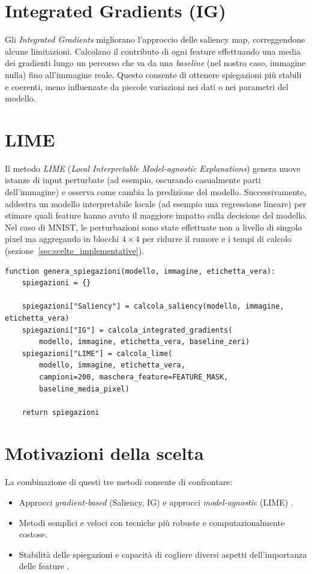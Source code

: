 \documentclass[12pt,a4paper,oneside]{report}
\numberwithin{figure}{chapter}
\numberwithin{table}{chapter}
\begin{document}
\section{Integrated Gradients (IG)}
Gli \emph{Integrated Gradients} \cite{sundararajan2017axiomatic} migliorano
l’approccio delle saliency map, correggendone alcune limitazioni. Calcolano il
contributo di ogni feature effettuando una media dei gradienti lungo un
percorso che va da una \emph{baseline} (nel nostro caso, immagine nulla) fino
all’immagine reale. Questo consente di ottenere spiegazioni più stabili e
coerenti, meno influenzate da piccole variazioni nei dati o nei parametri del
modello.

\section{LIME}
Il metodo \emph{LIME} (\emph{Local Interpretable Model-agnostic Explanations})
\cite{ribeiro2016lime} genera nuove istanze di input perturbate (ad esempio,
oscurando casualmente parti dell’immagine) e osserva come cambia la predizione
del modello. Successivamente, addestra un modello interpretabile locale (ad
esempio una regressione lineare) per stimare quali feature hanno avuto il
maggiore impatto sulla decisione del modello. Nel caso di MNIST, le
perturbazioni sono state effettuate non a livello di singolo pixel ma
aggregando in blocchi $4\times4$ per ridurre il rumore e i tempi di calcolo
(sezione~\ref{sec:scelte_implementative}).

\begin{lstlisting}[caption={Generazione delle spiegazioni}, label={lst:xai_generation}]
function genera_spiegazioni(modello, immagine, etichetta_vera):
    spiegazioni = {}
    
    spiegazioni["Saliency"] = calcola_saliency(modello, immagine, etichetta_vera)
    spiegazioni["IG"] = calcola_integrated_gradients(
        modello, immagine, etichetta_vera, baseline_zeri)
    spiegazioni["LIME"] = calcola_lime(
        modello, immagine, etichetta_vera,
        campioni=200, maschera_feature=FEATURE_MASK,
        baseline_media_pixel)
    
    return spiegazioni
\end{lstlisting}

\section{Motivazioni della scelta}
La combinazione di questi tre metodi consente di confrontare:
\begin{itemize}
      \item Approcci \emph{gradient-based} (Saliency, IG) e approcci \emph{model-agnostic}
            (LIME) \citep{simonyan2014deep,sundararajan2017axiomatic,ribeiro2016lime}.
      \item Metodi semplici e veloci con tecniche più robuste e computazionalmente costose.
      \item Stabilità delle spiegazioni e capacità di cogliere diversi aspetti
            dell’importanza delle feature \citep{samek2016evaluating,guidotti2018survey}.
\end{itemize}
\end{document}
